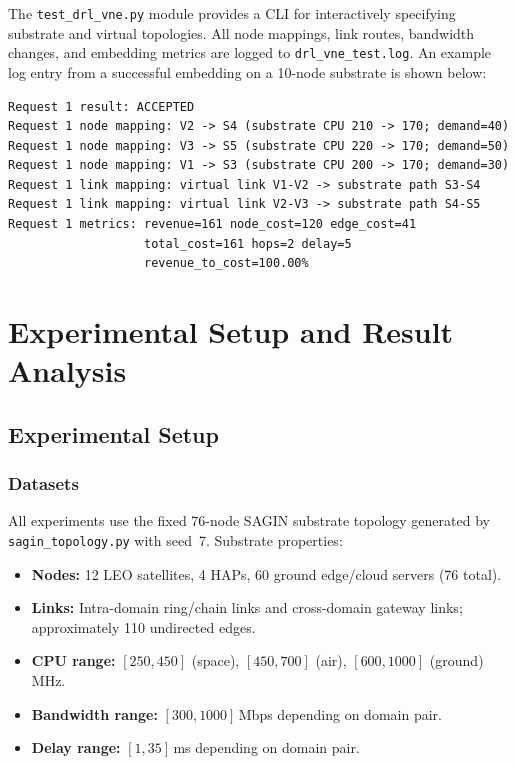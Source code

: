 \documentclass[12pt,a4paper]{report}
\begin{document}
The \texttt{test\_drl\_vne.py} module provides a CLI for interactively specifying substrate
and virtual topologies. All node mappings, link routes, bandwidth changes, and embedding
metrics are logged to \texttt{drl\_vne\_test.log}. An example log entry from a successful
embedding on a 10-node substrate is shown below:

\begin{verbatim}
Request 1 result: ACCEPTED
Request 1 node mapping: V2 -> S4 (substrate CPU 210 -> 170; demand=40)
Request 1 node mapping: V3 -> S5 (substrate CPU 220 -> 170; demand=50)
Request 1 node mapping: V1 -> S3 (substrate CPU 200 -> 170; demand=30)
Request 1 link mapping: virtual link V1-V2 -> substrate path S3-S4
Request 1 link mapping: virtual link V2-V3 -> substrate path S4-S5
Request 1 metrics: revenue=161 node_cost=120 edge_cost=41
                   total_cost=161 hops=2 delay=5
                   revenue_to_cost=100.00%
\end{verbatim}

\chapter{Experimental Setup and Result Analysis}
\label{ch:results}

\section{Experimental Setup}
\label{sec:exp-setup}

\subsection{Datasets}

All experiments use the fixed 76-node SAGIN substrate topology generated by
\texttt{sagin\_topology.py} with seed~7. Substrate properties:
\begin{itemize}[leftmargin=*]
  \item \textbf{Nodes:} 12 LEO satellites, 4 HAPs, 60 ground edge/cloud servers (76 total).
  \item \textbf{Links:} Intra-domain ring/chain links and cross-domain gateway links;
        approximately 110 undirected edges.
  \item \textbf{CPU range:} $[250,450]$ (space), $[450,700]$ (air), $[600,1000]$ (ground) MHz.
  \item \textbf{Bandwidth range:} $[300,1000]$\,Mbps depending on domain pair.
  \item \textbf{Delay range:} $[1,35]$\,ms depending on domain pair.
\end{itemize}
\end{document}
